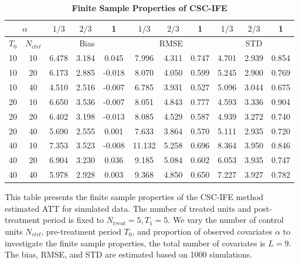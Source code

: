\documentclass[12pt]{article}
\begin{document}
\begin{table}[!ht]
    \centering
    \caption{\textbf{Finite Sample Properties of CSC-IFE}}
    \begin{tabular}{cc|ccc|ccc|ccc}
    \toprule
    \multicolumn{2}{c|}{$\alpha$} & $1/3$ & $2/3$ & 1 & $1/3$ & $2/3$ & 1 & $1/3$ & $2/3$ & 1 \\
    \hline
    $T_0$ & $N_{ctrl}$ & \multicolumn{3}{c|}{Bias} & \multicolumn{3}{c|}{RMSE}  & \multicolumn{3}{c}{STD} \\
    \hline
    10 & 10 & 6.478 & 3.184 & 0.045 & 7.996 & 4.311 & 0.747 & 4.701 & 2.939 & 0.854 \\
    10 & 20 & 6.173 & 2.885 & -0.018 & 8.070 & 4.050 & 0.599 & 5.245 & 2.900 & 0.769 \\
    10 & 40 & 4.510 & 2.516 & -0.007 & 6.785 & 3.931 & 0.527 & 5.096 & 3.044 & 0.675 \\
\cline{1-11}
    20 & 10 & 6.650 & 3.536 & -0.007 & 8.051 & 4.843 & 0.777 & 4.593 & 3.336 & 0.904 \\
    20 & 20 & 6.402 & 3.198 & -0.013 & 8.085 & 4.529 & 0.587 & 4.939 & 3.272 & 0.740 \\
    20 & 40 & 5.690 & 2.555 & 0.001 & 7.633 & 3.864 & 0.570 & 5.111 & 2.935 & 0.720 \\
\cline{1-11}
    40 & 10 & 7.353 & 3.523 & -0.008 & 11.132 & 5.258 & 0.696 & 8.364 & 3.950 & 0.846 \\
    40 & 20 & 6.904 & 3.230 & 0.036 & 9.185 & 5.084 & 0.602 & 6.053 & 3.935 & 0.747 \\
    40 & 40 & 5.978 & 2.928 & 0.003 & 9.368 & 4.850 & 0.650 & 7.227 & 3.927 & 0.782 \\
    \bottomrule
    \end{tabular}
    \begin{tablenotes}
        \item This table presents the finite sample properties of the CSC-IFE method estimated ATT for simulated data. The number of treated units and post-treatment period is fixed to $N_{treat} = 5, T_1=5$. We vary the number of control units $N_{ctrl}$, pre-treatment period $T_0$, and proportion of observed covariates $\alpha$ to investigate the finite sample properties, the total number of covariates is $L=9$. The bias, RMSE, and STD are estimated based on 1000 simulations.
    \end{tablenotes}
    \end{table}
\end{document}
